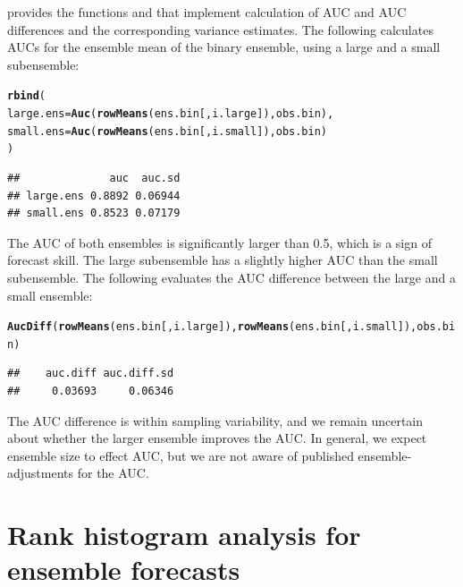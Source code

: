 \documentclass[article]{jss}\usepackage{graphicx, color}
\makeatletter
\newcommand{\hlfunctioncall}[1]{\textcolor[rgb]{0,0.501960784313725,0.752941176470588}{\textbf{#1}}}%
\newenvironment{kframe}{%
 \def\at@end@of@kframe{}%
 \ifinner\ifhmode%
  \def\at@end@of@kframe{\end{minipage}}%
  \begin{minipage}{\columnwidth}%
 \fi\fi%
 \def\FrameCommand##1{\hskip\@totalleftmargin \hskip-\fboxsep
 \colorbox{shadecolor}{##1}\hskip-\fboxsep
     \hskip-\linewidth \hskip-\@totalleftmargin \hskip\columnwidth}%
 \MakeFramed {\advance\hsize-\width
   \@totalleftmargin\z@ \linewidth\hsize
   \@setminipage}}%
 {\par\unskip\endMakeFramed%
 \at@end@of@kframe}
\newenvironment{knitrout}{}{} %
\makeatother
\begin{document}
 provides the functions  and  that implement calculation of AUC and AUC differences and the corresponding variance estimates.
The following calculates AUCs for the ensemble mean of the binary ensemble, using a large and a small subensemble:
%
\begin{knitrout}
\color{fgcolor}\begin{kframe}
\begin{alltt}
\hlfunctioncall{rbind}(
  large.ens = \hlfunctioncall{Auc}(\hlfunctioncall{rowMeans}(ens.bin[, i.large]), obs.bin),
  small.ens = \hlfunctioncall{Auc}(\hlfunctioncall{rowMeans}(ens.bin[, i.small]), obs.bin)
)
\end{alltt}
\begin{verbatim}
##              auc  auc.sd
## large.ens 0.8892 0.06944
## small.ens 0.8523 0.07179
\end{verbatim}
\end{kframe}
\end{knitrout}

%
The AUC of both ensembles is significantly larger than 0.5, which is a sign of forecast skill.
The large subensemble has a slightly higher AUC than the small subensemble.
The following evaluates the AUC difference between the large and a small ensemble:
%
\begin{knitrout}
\color{fgcolor}\begin{kframe}
\begin{alltt}
\hlfunctioncall{AucDiff}(\hlfunctioncall{rowMeans}(ens.bin[, i.large]), \hlfunctioncall{rowMeans}(ens.bin[, i.small]), obs.bin)
\end{alltt}
\begin{verbatim}
##    auc.diff auc.diff.sd 
##     0.03693     0.06346
\end{verbatim}
\end{kframe}
\end{knitrout}

%
The AUC difference is within sampling variability, and we remain uncertain about whether the larger ensemble improves the AUC.
In general, we expect ensemble size to effect AUC, but we are not aware of published ensemble-adjustments for the AUC. 



\section{Rank histogram analysis for ensemble forecasts}
\end{document}
